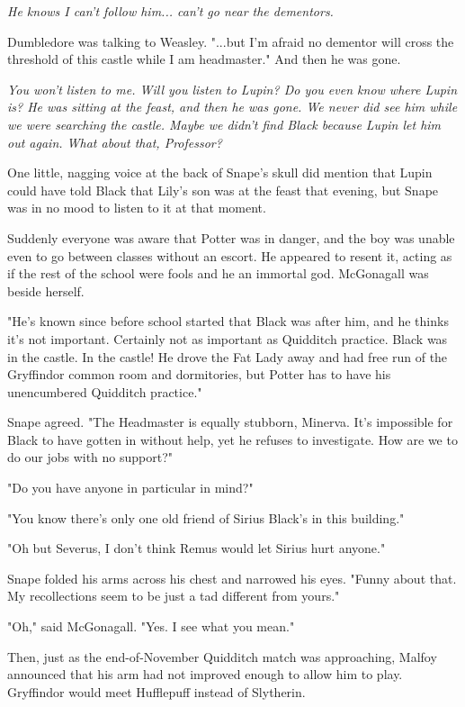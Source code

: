 \emph{He knows I can't follow him... can't go near the dementors.}

Dumbledore was talking to Weasley. "...but I'm afraid no dementor will cross the threshold of this castle while I am headmaster." And then he was gone.

\emph{You won't listen to me. Will you listen to Lupin? Do you even know where Lupin is? He was sitting at the feast, and then he was gone. We never did see him while we were searching the castle. Maybe we didn't find Black because Lupin let him out again. What about that, Professor?}

One little, nagging voice at the back of Snape's skull did mention that Lupin could have told Black that Lily's son was at the feast that evening, but Snape was in no mood to listen to it at that moment.

Suddenly everyone was aware that Potter was in danger, and the boy was unable even to go between classes without an escort. He appeared to resent it, acting as if the rest of the school were fools and he an immortal god. McGonagall was beside herself.

"He's known since before school started that Black was after him, and he thinks it's not important. Certainly not as important as Quidditch practice. Black was in the castle. In the castle! He drove the Fat Lady away and had free run of the Gryffindor common room and dormitories, but Potter has to have his unencumbered Quidditch practice."

Snape agreed. "The Headmaster is equally stubborn, Minerva. It's impossible for Black to have gotten in without help, yet he refuses to investigate. How are we to do our jobs with no support?"

"Do you have anyone in particular in mind?"

"You know there's only one old friend of Sirius Black's in this building."

"Oh but Severus, I don't think Remus would let Sirius hurt anyone."

Snape folded his arms across his chest and narrowed his eyes. "Funny about that. My recollections seem to be just a tad different from yours."

"Oh," said McGonagall. "Yes. I see what you mean."

Then, just as the end-of-November Quidditch match was approaching, Malfoy announced that his arm had not improved enough to allow him to play. Gryffindor would meet Hufflepuff instead of Slytherin.

